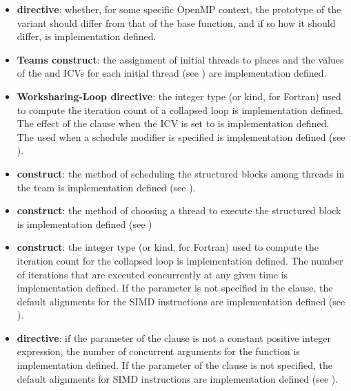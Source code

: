 \begin{itemize}
\item {} \textbf{directive}: whether, for some specific
  OpenMP context, the prototype of the variant should differ from that of
  the base function, and if so how it should differ, is implementation defined.

\item \textbf{Teams construct}: the assignment of initial threads to places and the values of the  and  ICVs for each initial thread (see ) are implementation defined.

\item \textbf{Worksharing-Loop directive}: the integer type (or kind, for Fortran) used to compute the iteration
count of a collapsed loop is implementation defined. The effect of the
 clause when the  ICV is set to  is
implementation defined. The  used when a 
schedule modifier is specified is implementation defined (see
    ).

\item {} \textbf{construct}: the method of scheduling the structured blocks among threads
in the team is implementation defined (see ).

\item {} \textbf{construct}: the method of choosing a thread to execute the structured block
is implementation defined (see )

\item {} \textbf{construct}: the integer type (or kind, for
  Fortran) used to compute the iteration count for the collapsed loop
  is implementation defined. The number of iterations that are
  executed concurrently at any given time is implementation
  defined. If the  parameter is not specified in the
   clause, the default alignments for the SIMD
  instructions are implementation defined (see ).

\item {} \textbf{directive}: if the parameter of the
   clause is not a constant positive integer expression,
  the number of concurrent arguments for the function is
  implementation defined. If the  parameter of the
   clause is not specified, the default alignments for
  SIMD instructions are implementation defined (see
  ).


\end{itemize}
